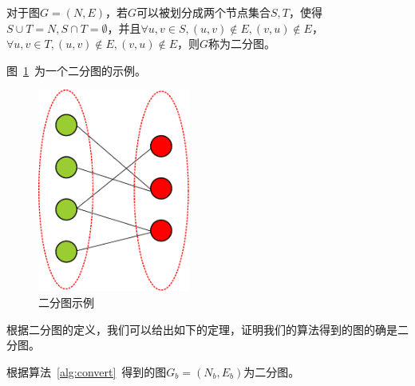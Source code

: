 \begin{definition}[二分图]
对于图$G = (N,E)$，若$G$可以被划分成两个节点集合$S,T$，使得$S\cup T = N, S\cap T = \emptyset$，并且$\forall u, v\in S, (u,v)\notin E,(v,u) \notin E$，$\forall u, v\in T, (u,v)\notin E,(v,u) \notin E$，则$G$称为二分图。
\end{definition}
\par
图~\ref{fig:biparEx}~为一个二分图的示例。
\begin{figure}
\centering
\includegraphics[width = 5cm]{./figures/img/bipartiteGraph.pdf}
\caption{二分图示例}
\label{fig:biparEx}
\end{figure}
\par
根据二分图的定义，我们可以给出如下的定理，证明我们的算法得到的图的确是二分图。
\begin{theorem}
根据算法~\ref{alg:convert}~得到的图$G_b=(N_b,E_b)$为二分图。
\end{theorem}

